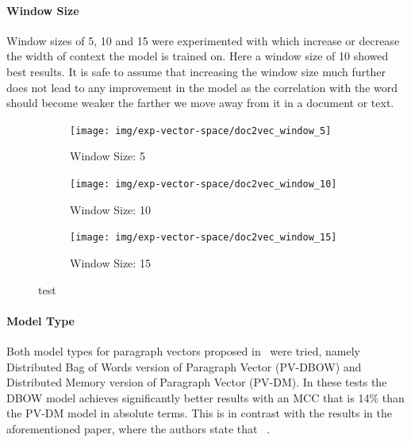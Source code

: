 \paragraph{Window Size}
Window sizes of 5, 10 and 15 were experimented with which increase or decrease the width of context the model is trained on. Here a window size of 10 showed best results. It is safe to assume that increasing the window size much further does not lead to any improvement in the model as the correlation with the word should become weaker the farther we move away from it in a document or text.


\begin{figure}[h!]
    \centering
    \begin{subfigure}[b]{0.49\textwidth}
      \texttt{[image: img/exp-vector-space/doc2vec\_window\_5]}
      \caption{Window Size: 5}
\label{fig:doc2vec_window_5}
    \end{subfigure}
    \begin{subfigure}[b]{0.49\textwidth}
      \texttt{[image: img/exp-vector-space/doc2vec\_window\_10]}
    \caption{Window Size: 10}
\label{fig:doc2vec_window_10}
    \end{subfigure}
    \begin{subfigure}[b]{0.49\textwidth}
      \texttt{[image: img/exp-vector-space/doc2vec\_window\_15]}
      \caption{Window Size: 15}
\label{fig:doc2vec_window_15}
  \end{subfigure}
\caption{test}
\label{fig:window}
\end{figure}


\paragraph{Model Type}
Both model types for paragraph vectors proposed in~\cite{Le:2014aa} were tried, namely Distributed Bag of Words version of Paragraph Vector (PV-DBOW) and Distributed Memory version of Paragraph Vector (PV-DM). In these tests the DBOW model achieves significantly better results with an MCC that is 14\% than the PV-DM model in absolute terms. This is in contrast with the results in the aforementioned paper, where the authors state that ~\cite{Le:2014aa}.


